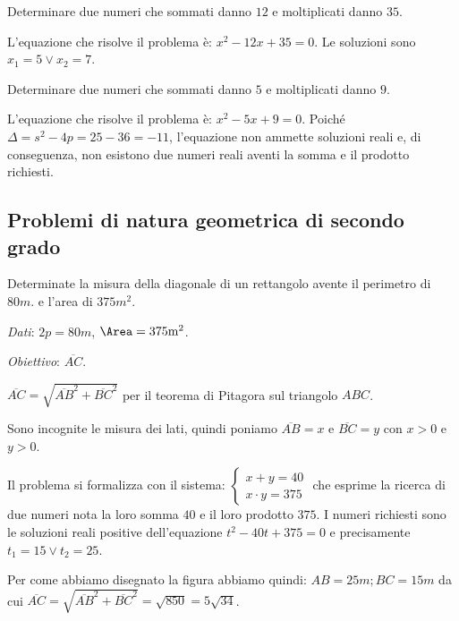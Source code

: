 \begin{exrig}
\begin{esempio}
Determinare due numeri che sommati danno $12$ e moltiplicati danno $35$.

L’equazione che risolve il problema è: $x^{2} - 12 x + 35 = 0$. Le soluzioni sono $x_{1} = 5 \vee x_{2} = 7$.
\end{esempio}

\begin{esempio}
Determinare due numeri che sommati danno $5$ e moltiplicati danno $9$.

L’equazione che risolve il problema è: $x^{2} - 5 x + 9 = 0$. Poiché $\Delta = s^{2} - 4 p = 25 - 36 = - 11$, l’equazione non ammette soluzioni reali e, di conseguenza, non esistono due numeri reali aventi la somma e il prodotto richiesti.
\end{esempio}
\end{exrig}
\vspazio{}

\subsection{Problemi di natura geometrica di secondo grado}

\begin{problema}
Determinate la misura della diagonale di un rettangolo avente il perimetro di $80\unit{m}$. e l’area di $375\unit{m^2}$.
\end{problema}

\begin{center}
 
\end{center}

\emph{Dati}: $2 p = 80 \unit{m}$, $\Area = 375\unit{m^2}$.

\emph{Obiettivo}: $\overline {AC}$.


\begin{soluzione}

$\overline {AC} = \sqrt{\overline {AB}^{2} + \overline {BC}^{2}}$ per il teorema di Pitagora sul triangolo $ABC$.

Sono incognite le misura dei lati, quindi poniamo $\overline {AB} = x$ e $\overline {BC} = y $ con $x > 0$ e $y > 0$.

Il problema si formalizza con il sistema:
$\left\{ \begin{array}{l} x + y = 40 \\x \cdot y = 375 \end{array}\right.$
che esprime la ricerca di due numeri nota la loro somma $40$ e il loro prodotto $375$. I numeri richiesti sono le soluzioni reali positive dell’equazione $t^{2} - 40 t + 375 = 0$ e precisamente $t_{1} = 15 \vee t_{2} = 25$.

Per come abbiamo disegnato la figura abbiamo quindi: $AB = 25\unit{m}; BC = 15\unit{m}$ da cui $\overline {AC} = \sqrt{\overline {AB}^{2} + \overline {BC}^{2}} =\sqrt{850} = 5 \sqrt{34}$.
\end{soluzione}
\vspazio{}

